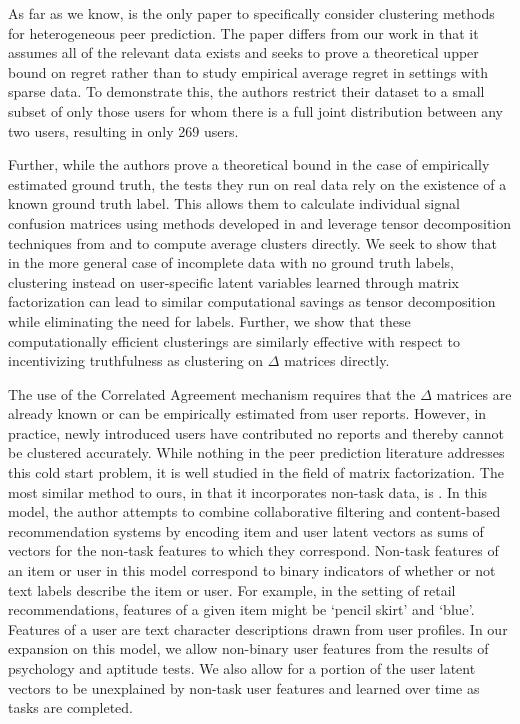 \documentclass{article}
\begin{document}
As far as we know, \citep{agarwal2017} is the only paper to specifically consider clustering methods for heterogeneous peer prediction. The paper differs from our work in that it assumes all of the relevant data exists and seeks to prove a theoretical upper bound on regret rather than to study empirical average regret in settings with sparse data. To demonstrate this, the authors restrict their dataset to a small subset of only those users for whom there is a full joint distribution between any two users, resulting in only 269 users. 

Further, while the authors prove a theoretical bound in the case of empirically estimated ground truth, the tests they run on real data rely on the existence of a known ground truth label. This allows them to calculate individual signal confusion matrices using methods developed in \citet{dawid1979maximum} and leverage tensor decomposition techniques from \citet{anandkumar2014tensor} and \citet{zhang2016spectral} to compute average clusters directly. We seek to show that in the more general case of incomplete data with no ground truth labels, clustering instead on user-specific latent variables learned through matrix factorization can lead to similar computational savings as tensor decomposition while eliminating the need for labels.  Further, we show that these computationally efficient clusterings are similarly effective with respect to incentivizing truthfulness as clustering on $\Delta$ matrices directly.

The use of the Correlated Agreement mechanism \citep{shnayder2016informed} requires that the $\Delta$ matrices are already known or can be empirically estimated from user reports. However, in practice, newly introduced users have contributed no reports and thereby cannot be clustered accurately. While nothing in the peer prediction literature addresses this cold start problem, it is well studied in the field of matrix factorization. The most similar method to ours, in that it incorporates non-task data, is \citep{kula2015metadata}. In this model, the author attempts to combine collaborative filtering and content-based recommendation systems by encoding item and user latent vectors as sums of vectors for the non-task features to which they correspond. Non-task features of an item or user in this model correspond to binary indicators of whether or not text labels describe the item or user. For example, in the setting of retail recommendations, features of a given item might be `pencil skirt' and `blue'. Features of a user are text character descriptions drawn from user profiles. In our expansion on this model, we allow non-binary user features from the results of psychology and aptitude tests. We also allow for a portion of the user latent vectors to be unexplained by non-task user features and learned over time as tasks are completed.
\end{document}
